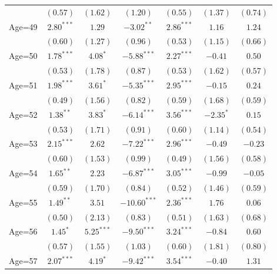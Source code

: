 \documentclass[fullpage]{paper}
\begin{document}
\begin{center}
\begin{longtable}{l c c c c c c }
            & $(0.57)$      & $(1.62)$      & $(1.20)$       & $(0.55)$     & $(1.37)$      & $(0.74)$      \\
Age=49      & $2.80^{***}$  & $1.29$        & $-3.02^{**}$   & $2.86^{***}$ & $1.16$        & $1.24$        \\
            & $(0.60)$      & $(1.27)$      & $(0.96)$       & $(0.53)$     & $(1.15)$      & $(0.66)$      \\
Age=50      & $1.78^{***}$  & $4.08^{*}$    & $-5.88^{***}$  & $2.27^{***}$ & $-0.41$       & $0.50$        \\
            & $(0.53)$      & $(1.78)$      & $(0.87)$       & $(0.53)$     & $(1.62)$      & $(0.57)$      \\
Age=51      & $1.98^{***}$  & $3.61^{*}$    & $-5.35^{***}$  & $2.95^{***}$ & $-0.15$       & $0.24$        \\
            & $(0.49)$      & $(1.56)$      & $(0.82)$       & $(0.59)$     & $(1.68)$      & $(0.59)$      \\
Age=52      & $1.38^{**}$   & $3.83^{*}$    & $-6.14^{***}$  & $3.56^{***}$ & $-2.35^{*}$   & $0.15$        \\
            & $(0.53)$      & $(1.71)$      & $(0.91)$       & $(0.60)$     & $(1.14)$      & $(0.54)$      \\
Age=53      & $2.15^{***}$  & $2.62$        & $-7.22^{***}$  & $2.96^{***}$ & $-0.49$       & $-0.23$       \\
            & $(0.60)$      & $(1.53)$      & $(0.99)$       & $(0.49)$     & $(1.56)$      & $(0.58)$      \\
Age=54      & $1.65^{**}$   & $2.23$        & $-6.87^{***}$  & $3.05^{***}$ & $-0.99$       & $-0.05$       \\
            & $(0.59)$      & $(1.70)$      & $(0.84)$       & $(0.52)$     & $(1.46)$      & $(0.59)$      \\
Age=55      & $1.49^{**}$   & $3.51$        & $-10.60^{***}$ & $2.36^{***}$ & $1.76$        & $0.06$        \\
            & $(0.50)$      & $(2.13)$      & $(0.83)$       & $(0.51)$     & $(1.63)$      & $(0.68)$      \\
Age=56      & $1.45^{*}$    & $5.25^{***}$  & $-9.50^{***}$  & $3.24^{***}$ & $-0.84$       & $0.60$        \\
            & $(0.57)$      & $(1.55)$      & $(1.03)$       & $(0.60)$     & $(1.81)$      & $(0.80)$      \\
Age=57      & $2.07^{***}$  & $4.19^{*}$    & $-9.42^{***}$  & $3.54^{***}$ & $-0.40$       & $1.31$        \\

\end{longtable}
\end{center}
\end{document}
